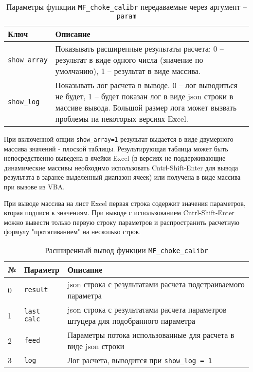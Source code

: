\begin{table}[H]
	\caption{Параметры функции  \texttt{MF_choke_calibr} передаваемые через аргумент -- \texttt{param}}
	\label{table:param_list_choke_calibr}
	\begin{tabular}{p{}p{}}
		\hline
		Ключ & Описание  \\ \hline
		\texttt{show_array} & Показывать расширенные результаты расчета: 0 -- результат в виде одного числа (значение по умолчанию), 1 -- результат в виде массива.    \\ \hline
		
		\texttt{show_log} & Показывать лог расчета в выводе. 0 -- лог выводиться не будет, 1 -- будет показан лог в виде json строки в массиве вывода. Большой размер лога может вызвать проблемы на некоторых версиях Excel.   \\ \hline
		
	\end{tabular}
\end{table}

При включенной опции \texttt{show_array=1} результат выдается в виде двумерного массива значений - плоской таблицы. Результирующая таблица может быть непосредственно выведена в ячейки Excel (в версиях не поддерживающие динамические массивы необходимо использовать Cntrl-Shift-Enter для вывода результата в заранее выделенный диапазон ячеек) или получена в виде массива при вызове из VBA.

При выводе массива на лист Excel первая строка содержит значения параметров, вторая подписи к значениям. При выводе с использованием Cntrl-Shift-Enter можно вывести только первую строку параметров и распространить расчетную формулу "протягиванием" на несколько строк.

\begin{table}[H]
	\caption{Расширенный вывод функции \texttt{MF_choke_calibr} }
	\label{table:param_list_MF_choke_calibr}
	\begin{tabular}{p{}p{}p{}}
		\hline
		№& Параметр & Описание  \\ \hline
		0 & \texttt{result} & json строка с результатами расчета подстраиваемого параметра \\ \hline
		1 & \texttt{last calc} & json строка с результатами расчета параметров штуцера для подобранного параметра \\ \hline
		2 & \texttt{feed} & Параметры потока использованные для расчета в виде json строки\\ \hline
		3 & \texttt{log} & Лог расчета, выводится при \texttt{show_log = 1}  \\ \hline
		
	\end{tabular}
\end{table}

